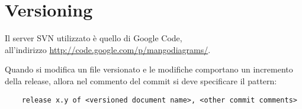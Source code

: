 \section{Versioning}
Il server SVN utilizzato è quello di Google Code, \\all'indirizzo \href{http://code.google.com/p/mangodiagrams/}{http://code.google.com/p/mangodiagrams/}.

Quando si modifica un file versionato e le modifiche comportano un incremento della release, allora nel commento del commit si deve specificare il pattern: 
\begin{verbatim}
	release x.y of <versioned document name>, <other commit comments>
\end{verbatim}

